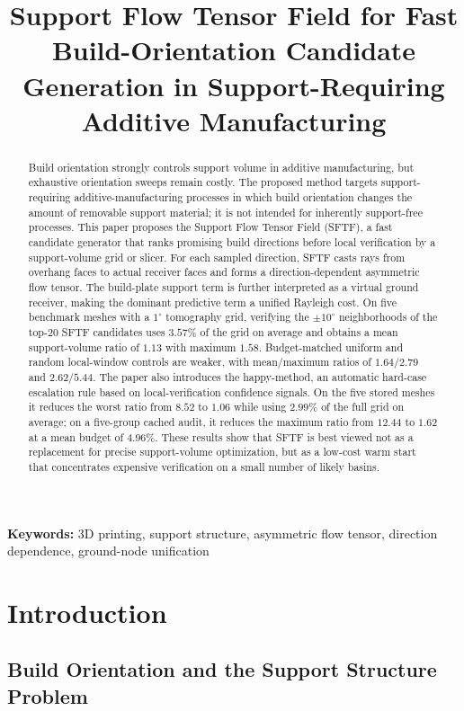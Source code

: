 \documentclass[11pt,a4paper]{article}
\title{Support Flow Tensor Field for Fast Build-Orientation Candidate Generation in Support-Requiring Additive Manufacturing}
\author{}
\date{}
\begin{document}
\maketitle

\begin{abstract}
Build orientation strongly controls support volume in additive manufacturing, but exhaustive orientation sweeps remain costly.
The proposed method targets support-requiring additive-manufacturing processes in which build orientation changes the amount of removable support material; it is not intended for inherently support-free processes.
This paper proposes the Support Flow Tensor Field (SFTF), a fast candidate generator that ranks promising build directions before local verification by a support-volume grid or slicer.
For each sampled direction, SFTF casts rays from overhang faces to actual receiver faces and forms a direction-dependent asymmetric flow tensor.
The build-plate support term is further interpreted as a virtual ground receiver, making the dominant predictive term a unified Rayleigh cost.
On five benchmark meshes with a $1^\circ$ tomography grid, verifying the $\pm 10^\circ$ neighborhoods of the top-20 SFTF candidates uses $3.57\%$ of the grid on average and obtains a mean support-volume ratio of $1.13$ with maximum $1.58$.
Budget-matched uniform and random local-window controls are weaker, with mean/maximum ratios of $1.64/2.79$ and $2.62/5.44$.
The paper also introduces the happy-method, an automatic hard-case escalation rule based on local-verification confidence signals.
On the five stored meshes it reduces the worst ratio from $8.52$ to $1.06$ while using $2.99\%$ of the full grid on average; on a five-group cached audit, it reduces the maximum ratio from $12.44$ to $1.62$ at a mean budget of $4.96\%$.
These results show that SFTF is best viewed not as a replacement for precise support-volume optimization, but as a low-cost warm start that concentrates expensive verification on a small number of likely basins.
\end{abstract}

\noindent\textbf{Keywords:} 3D printing, support structure, asymmetric flow tensor, direction dependence, ground-node unification

\section{Introduction}

\subsection{Build Orientation and the Support Structure Problem}
\end{document}
